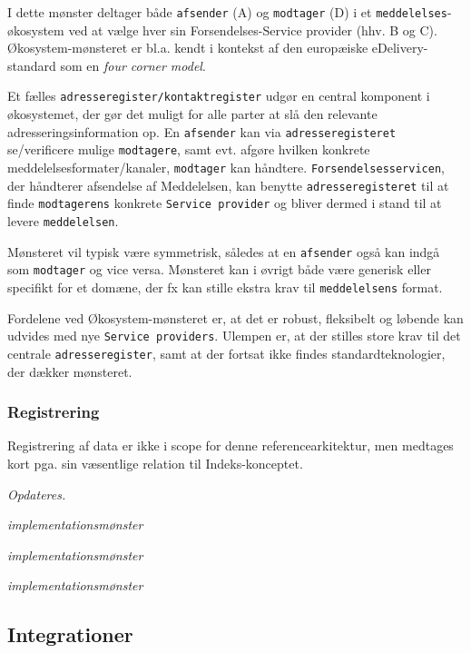 I dette mønster deltager både \texttt{afsender} (A) og \texttt{modtager}
(D) i et \texttt{meddelelses}-økosystem ved at vælge hver sin
Forsendelses-Service provider (hhv. B og C). Økosystem-mønsteret er
bl.a. kendt i kontekst af den europæiske eDelivery-standard som en
\emph{four corner model}.

Et fælles \texttt{adresseregister/kontaktregister} udgør en central
komponent i økosystemet, der gør det muligt for alle parter at slå den
relevante adresseringsinformation op. En \texttt{afsender} kan via
\texttt{adresseregisteret} se/verificere mulige \texttt{modtagere}, samt
evt. afgøre hvilken konkrete meddelelsesformater/kanaler,
\texttt{modtager} kan håndtere. \texttt{Forsendelsesservicen}, der
håndterer afsendelse af Meddelelsen, kan benytte
\texttt{adresseregisteret} til at finde \texttt{modtagerens} konkrete
\texttt{Service\ provider} og bliver dermed i stand til at levere
\texttt{meddelelsen}.

Mønsteret vil typisk være symmetrisk, således at en \texttt{afsender}
også kan indgå som \texttt{modtager} og vice versa. Mønsteret kan i
øvrigt både være generisk eller specifikt for et domæne, der fx kan
stille ekstra krav til \texttt{meddelelsens} format.

Fordelene ved Økosystem-mønsteret er, at det er robust, fleksibelt og
løbende kan udvides med nye \texttt{Service\ providers}. Ulempen er, at
der stilles store krav til det centrale \texttt{adresseregister}, samt
at der fortsat ikke findes standardteknologier, der dækker mønsteret.

\subsubsection{Registrering}\label{registrering}

Registrering af data er ikke i scope for denne referencearkitektur, men
medtages kort pga. sin væsentlige relation til Indeks-konceptet.

\emph{Opdateres.}

\begin{description}
\tightlist
\item[Ansvar hos registrant]
\emph{implementationsmønster}
\item[Ansvar hos dataejer]
\emph{implementationsmønster}
\item[Ansvar hos distributør]
\emph{implementationsmønster}
\end{description}

\subsection{Integrationer}\label{integrationer}

